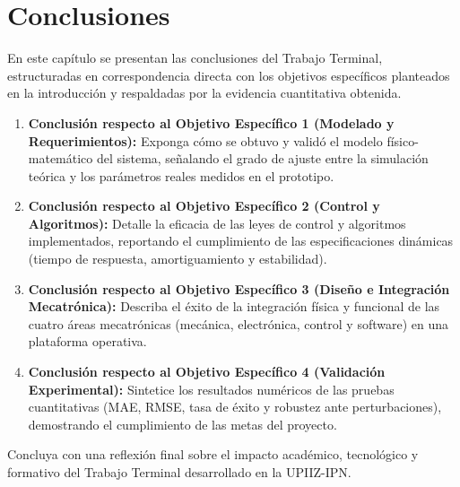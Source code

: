 
\chapter{Conclusiones}
\label{cap:conclusiones}


En este capítulo se presentan las conclusiones del Trabajo Terminal, estructuradas en correspondencia directa con los objetivos específicos planteados en la introducción y respaldadas por la evidencia cuantitativa obtenida.

\begin{enumerate}
    \item \textbf{Conclusión respecto al Objetivo Específico 1 (Modelado y Requerimientos):} Exponga cómo se obtuvo y validó el modelo físico-matemático del sistema, señalando el grado de ajuste entre la simulación teórica y los parámetros reales medidos en el prototipo.
    
    \item \textbf{Conclusión respecto al Objetivo Específico 2 (Control y Algoritmos):} Detalle la eficacia de las leyes de control y algoritmos implementados, reportando el cumplimiento de las especificaciones dinámicas (tiempo de respuesta, amortiguamiento y estabilidad).
    
    \item \textbf{Conclusión respecto al Objetivo Específico 3 (Diseño e Integración Mecatrónica):} Describa el éxito de la integración física y funcional de las cuatro áreas mecatrónicas (mecánica, electrónica, control y software) en una plataforma operativa.
    
    \item \textbf{Conclusión respecto al Objetivo Específico 4 (Validación Experimental):} Sintetice los resultados numéricos de las pruebas cuantitativas (MAE, RMSE, tasa de éxito y robustez ante perturbaciones), demostrando el cumplimiento de las metas del proyecto.
\end{enumerate}

\noindent Concluya con una reflexión final sobre el impacto académico, tecnológico y formativo del Trabajo Terminal desarrollado en la UPIIZ-IPN.
